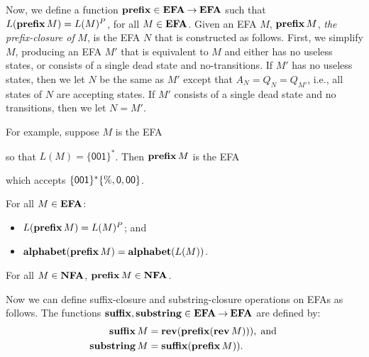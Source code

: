 Now, we define a function $\mathbf{prefix}\in\mathbf{EFA}\mathbin{\to}\mathbf{EFA}$ such that
%
%
%
%
%
$L(\mathbf{prefix}\,M)=L(M)^P$, for all $M\in\mathbf{EFA}$.  Given an EFA $M$,
$\mathbf{prefix}\,M$, \emph{the prefix-closure of} $M$,
is the EFA $N$ that is constructed as follows.
First, we simplify $M$, producing an EFA $M'$ that is equivalent to
$M$ and either has no useless states, or consists of a single dead
state and no-transitions.
If $M'$ has no useless states, then we let $N$ be the same as $M'$
except that $A_N = Q_N=Q_{M'}$,
i.e., all states of $N$ are accepting states.
If $M'$ consists of a single dead state and no transitions,
then we let $N=M'$.

For example, suppose $M$ is the EFA
\begin{center}

\end{center}
so that $L(M)=\{\mathsf{001}\}^*$.  Then
$\mathbf{prefix}\,M$ is the EFA
\begin{center}

\end{center}
which accepts
$\{\mathsf{001}\}^*\{\%,\mathsf{0},\mathsf{0}\mathsf{0}\}$.

\begin{theorem}
\label{EFAPrefix}
For all $M\in\mathbf{EFA}$:
\begin{itemize}
\item $L(\mathbf{prefix}\,M) = L(M)^P$; and

\item $\mathbf{alphabet}(\mathbf{prefix}\,M) = \mathbf{alphabet}(L(M))$.
\end{itemize}
\end{theorem}

\begin{proposition}
For all $M\in\mathbf{NFA}$, $\mathbf{prefix}\,M\in\mathbf{NFA}$.
\end{proposition}
%
%
%
Now we can define suffix-closure and substring-closure
operations on EFAs as follows.  The functions $\mathbf{suffix},\mathbf{substring}\in
\mathbf{EFA}\mathbin{\to}\mathbf{EFA}$ are defined by:
%
%
%
%
%
%
\begin{align*}
\mathbf{suffix}\,M &= \mathbf{rev}(\mathbf{prefix}(\mathbf{rev}\,M))) , \;\allowbreak\mbox{and}\allowbreak\; \\
\mathbf{substring}\,M &= \mathbf{suffix}(\mathbf{prefix}\,M)) .
\end{align*}


